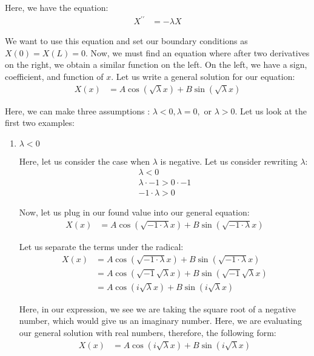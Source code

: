 \documentclass{article}
\begin{document}
\begin{enumerate}
%
Here, we have the equation:
\begin{align}
  X^{\prime\prime} & = - \lambda X
\end{align}

We want to use this equation and set our boundary conditions as $X(0) = X(L) = 0$. Now, we must find an equation where after two derivatives on the right, we obtain a similar function on the left. On the left, we have a sign, coefficient, and function of $x$. Let us write a general solution for our equation:
%
\begin{align}
  X(x) & = A \cos(\sqrt \lambda x) + B \sin( \sqrt \lambda x)
\end{align}

Here, we can make three assumptions : $\lambda < 0, \lambda = 0,$ or $\lambda > 0$. Let us look at the first two examples:

\begin{enumerate}
  \item $\lambda < 0$

  Here, let us consider the case when $\lambda$ is negative. Let us consider rewriting $\lambda$:
  \begin{align}
    \lambda < 0\\
    \lambda \cdot -1 > 0 \cdot -1\\
    -1 \cdot \lambda > 0
  \end{align}

  Now, let us plug in our found value into our general equation:
  \begin{align}
    X(x) & =
    A \cos (\sqrt{- 1 \cdot \lambda} x) +
    B \sin (\sqrt{- 1 \cdot \lambda} x)
  \end{align}

  Let us separate the terms under the radical:
%
  \begin{align}
    X(x) & =
    A \cos (\sqrt{- 1 \cdot \lambda} x) +
    B \sin (\sqrt{- 1 \cdot \lambda} x)\\
    & =
    A \cos (\sqrt{- 1} \sqrt{\lambda} x) +
    B \sin (\sqrt{- 1} \sqrt{\lambda} x)\\
    & =
    A \cos (i \sqrt{\lambda} x) +
    B \sin (i \sqrt{\lambda} x)
  \end{align}

  Here, in our expression, we see we are taking the square root of a negative number, which would give us an imaginary number. Here, we are evaluating our general solution with real numbers, therefore, the following form:
  \begin{align}
    X(x) & =
    A \cos (i \sqrt{\lambda} x) +
    B \sin (i \sqrt{\lambda} x)
  \end{align}


\end{enumerate}
\end{enumerate}
\end{document}
